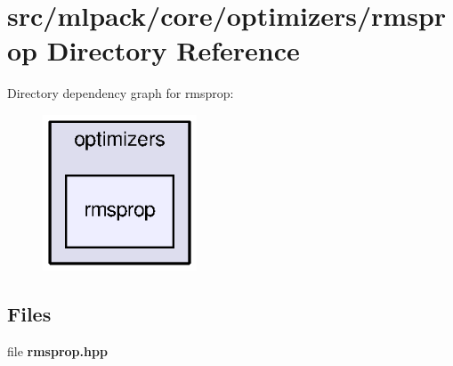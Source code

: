 \section{src/mlpack/core/optimizers/rmsprop Directory Reference}
\label{dir_e81b6b380a93e771ede77bbcce0ca7b6}
Directory dependency graph for rmsprop\+:
\nopagebreak
\begin{figure}[H]
\begin{center}
\leavevmode
\includegraphics[width=130pt]{dir_e81b6b380a93e771ede77bbcce0ca7b6_dep}
\end{center}
\end{figure}
\subsection*{Files}
\begin{DoxyCompactItemize}
\item 
file {\bf rmsprop.\+hpp}
\end{DoxyCompactItemize}
